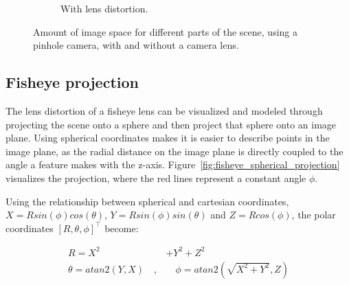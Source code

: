\begin{figure}[!htb]
\begin{subfigure}[b]{0.45\textwidth}
    \caption{With lens distortion.}
    \label{fig:wide_angle_pinhole_lens}
    \end{subfigure}
    
    \caption{Amount of image space for different parts of the scene, using a pinhole camera, with and without a camera lens.}
    \label{fig:wide_angle_pinhole}
    
\end{figure}

\subsection{Fisheye projection}

The lens distortion of a fisheye lens can be visualized and modeled through projecting the scene onto a sphere and then project that sphere onto an image plane. Using spherical coordinates makes it is easier to describe points in the image plane, as the radial distance on the image plane is directly coupled to the angle a feature makes with the z-axis. Figure~\ref{fig:fisheye_spherical_projection} visualizes the projection, where the red lines represent a constant angle $\phi$.

Using the relationship between spherical and cartesian coordinates, $X = Rsin(\phi)cos(\theta)$, $Y = Rsin(\phi)sin(\theta)$ and $Z = Rcos(\phi)$, the polar coordinates $[R,\theta,\phi]^\top$ become:

\begin{equation}
    \begin{aligned}
        R = X^2 &+ Y^2 + Z^2 \\
        \theta = atan2\left(Y,X\right)\quad  ,& \quad \phi = atan2\left(\sqrt{X^2 + Y^2},Z\right)
    \end{aligned}
    \label{eq:theory_polar_coords}
\end{equation}

